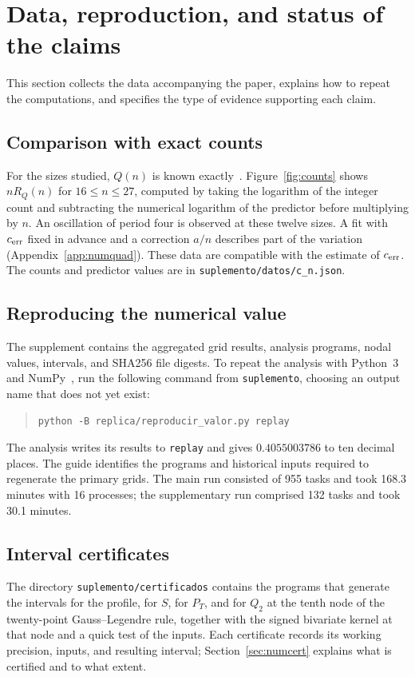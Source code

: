 \section{Data, reproduction, and status of the claims}\label{sec:datos}
This section collects the data accompanying the paper, explains how to repeat the computations, and
specifies the type of evidence supporting each claim.

\subsection{Comparison with exact counts}\label{sec:conteos-exactos}
For the sizes studied, $Q(n)$ is known exactly~\cite{oeis,q27}. Figure~\ref{fig:counts} shows $nR_Q(n)$
for $16\le n\le27$, computed by taking the logarithm of the integer count and subtracting the numerical
logarithm of the predictor before multiplying by $n$. An oscillation of period four is observed at these
twelve sizes. A fit with $c_{\mathrm{err}}$ fixed in advance and a correction $a/n$ describes part of the variation
(Appendix~\ref{app:numquad}). These data are compatible with the estimate of $c_{\mathrm{err}}$. The counts and
predictor values are in \texttt{suplemento/datos/c\_n.json}.


\subsection{Reproducing the numerical value}\label{sec:reproduccion}
The supplement contains the aggregated grid results, analysis programs, nodal values, intervals, and
SHA256 file digests. To repeat the analysis with Python~3 and NumPy~\cite{numpy}, run the following
command from
\texttt{suplemento}, choosing an output name that does not yet exist:
\begin{quote}
\verb|python -B replica/reproducir_valor.py replay|
\end{quote}
The analysis writes its results to \texttt{replay} and gives $0.4055003786$ to ten decimal places. The
guide identifies the programs and historical inputs required to regenerate the primary grids. The main
run consisted of 955 tasks and took 168.3 minutes with 16 processes; the supplementary run comprised 132
tasks and took 30.1 minutes.

\subsection{Interval certificates}
The directory \texttt{suplemento/certificados} contains the programs that generate the intervals for the
profile, for $S$, for $P_T$, and for $Q_2$ at the tenth node of the twenty-point Gauss--Legendre rule,
together with the signed bivariate kernel at that node and a quick test of the inputs. Each certificate
records its working precision, inputs, and resulting interval; Section~\ref{sec:numcert} explains what is
certified and to what extent.

